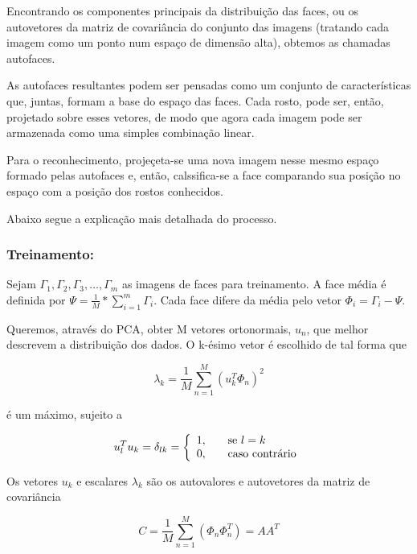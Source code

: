 \documentclass[10pt,a4paper]{article}
\begin{document}
	Encontrando os componentes principais da distribuição das faces, ou os autovetores da matriz de covariância do conjunto das imagens (tratando cada imagem como um ponto num espaço de dimensão alta), obtemos as chamadas autofaces.

	As autofaces resultantes podem ser pensadas como um conjunto de características que, juntas, formam a base do espaço das faces. Cada rosto, pode ser, então, projetado sobre esses vetores, de modo que agora cada imagem pode ser armazenada como uma simples combinação linear.

Para o reconhecimento, projeçeta-se uma nova imagem nesse mesmo espaço formado pelas autofaces e, então, calssifica-se a face comparando sua posição no espaço com a posição dos rostos conhecidos.

Abaixo segue a explicação mais detalhada do processo.
\subsubsection*{Treinamento:}

Sejam $\Gamma_1, \Gamma_2, \Gamma_3, \ldots, \Gamma_m$ as imagens de
faces para treinamento. A face média é definida por {$\Psi
  =\frac{1}{M}* \sum_{i=1}^m\Gamma_i$}. Cada face difere da média pelo vetor {$\Phi_i = \Gamma_i - \Psi$}.

Queremos, através do PCA, obter M vetores ortonormais, $u_n$, que
melhor descrevem a distribuição dos dados. O k-ésimo vetor é escolhido
de tal  forma que


\begin{equation}
  \lambda_{k}=\frac{1}{M}\sum_{n=1}^{M}(u_k^T\Phi_n)^2
\end{equation}

é um máximo, sujeito a

\begin{equation}
  u_l^Tu_k=\delta_{lk}=\left \{
    \begin{array}{l l}
      1, & \quad \text{se $l=k$} \\
      0, & \quad \text{caso contrário}\\
    \end{array}
  \right.
\end{equation}

Os vetores $u_k$ e escalares $\lambda_k$ são os autovalores e autovetores da matriz de covariância

\begin{equation}
  C=\frac{1}{M}\sum_{n=1}^{M}(\Phi_n\Phi_n^T)= AA^T
\end{equation}
\end{document}
